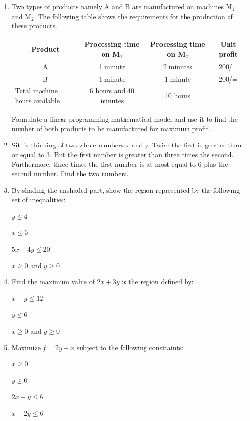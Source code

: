 \begin{enumerate}
	\item Two types of products namely A and B are manufactured on machines M$_1$ and M$_2$. The following table shows the requirements for the production of these products.
	\begin{center}
	\begin{tabular}{|p{3cm}|c|c|c|} \hline
	\multicolumn{1}{|c|}{\textbf{Product}} & \textbf{Processing time on M$_1$} & \textbf{Processing time on M$_2$} & \textbf{Unit profit}\\ \hline
	\multicolumn{1}{|c|}{A} & 1 minute & 2 minutes & 200/= \\ \hline
	\multicolumn{1}{|c|}{B} & 1 minute & 1 minute & 200/= \\ \hline
	Total machine hours available & 6 hours and 40 minutes & 10 hours & \\ \hline
	\end{tabular}
	\end{center}
	\noindent Formulate a linear programming mathematical model and use it to find the number of both products to be manufactured for maximum profit.
	
	\item Siti is thinking of two whole numbers x and y. Twice the first is greater than or equal to 3. But the first number is greater than three times the second. Furthermore, three times the first number is at most equal to 6 plus the second number. Find the two numbers.
	
	\item By shading the unshaded part, show the region represented by the following set of inequalities:
	
	$y\leq 4$
	
	$x\leq 5$
	
	$5x + 4y \leq 20$
	
	$x\geq 0$ and $y\geq 0$
	
	\item Find the maximum value of $2x + 3y$ is the region defined by:
	
	$x + y\leq 12$
	
	$y\leq 6$
	
	$x\geq 0$ and $y\geq 0$
	
	\item Maximize $f = 2y - x$ subject to the following constraints:
	
	$x\geq 0$ 
	
	$y\geq 0$
	
	$2x + y\leq 6$
	
	$x + 2y\leq 6$
	

\end{enumerate}
